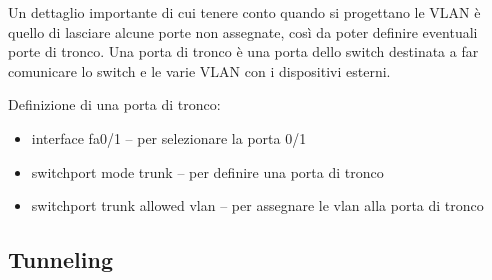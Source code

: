Un dettaglio importante di cui tenere conto quando si progettano le VLAN è quello di lasciare alcune porte non assegnate, così da poter definire eventuali porte di tronco. Una porta di tronco è una porta dello switch destinata a far comunicare lo switch e le varie VLAN con i dispositivi esterni.

Definizione di una porta di tronco:

\begin{itemize}
    \item interface fa0/1 – per selezionare la porta 0/1
    \item switchport mode trunk – per definire una porta di tronco
    \item switchport trunk allowed vlan – per assegnare le vlan alla porta di tronco
\end{itemize}

\subsection{Tunneling}